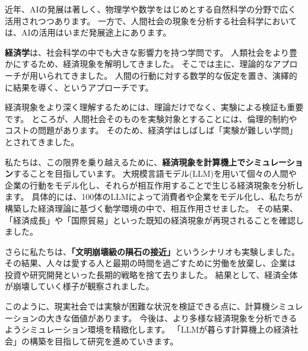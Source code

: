 近年、AIの発展は著しく、物理学や数学をはじめとする自然科学の分野で広く活用されつつあります。
一方で、人間社会の現象を分析する社会科学においては、AIの活用はいまだ発展途上にあります。

\textbf{経済学}は、社会科学の中でも大きな影響力を持つ学問です。
人類社会をより豊かにするため、経済現象を解明してきました。
そこでは主に、理論的なアプローチが用いられてきました。
人間の行動に対する数学的な仮定を置き、演繹的に結果を導く、というアプローチです。

経済現象をより深く理解するためには、理論だけでなく、実験による検証も重要です。
ところが、人間社会そのものを実験対象とすることには、倫理的制約やコストの問題があります。
そのため、経済学はしばしば「実験が難しい学問」とされてきました。

私たちは、この限界を乗り越えるために、\textbf{経済現象を計算機上でシミュレーション}することを目指しています。
大規模言語モデル(LLM)を用いて個々の人間や企業の行動をモデル化し、それらが相互作用することで生じる経済現象を分析します。
具体的には、100体のLLMによって消費者や企業をモデル化し、私たちが構築した経済理論に基づく動学環境の中で、相互作用させました。
その結果、「経済成長」や「国際貿易」といった既知の経済現象が再現されることを確認しました。

さらに私たちは、\textbf{「文明崩壊級の隕石の接近」}というシナリオも実験しました。
その結果、人々は愛する人と最期の時間を過ごすために労働を放棄し、企業は投資や研究開発といった長期的戦略を捨て去りました。
結果として、経済全体が崩壊していく様子が観察されました。

このように、現実社会では実験が困難な状況を検証できる点に、計算機シミュレーションの大きな価値があります。
今後は、より多様な経済現象を分析できるようシミュレーション環境を精緻化します。
「LLMが暮らす計算機上の経済社会」の構築を目指して研究を進めていきます。
